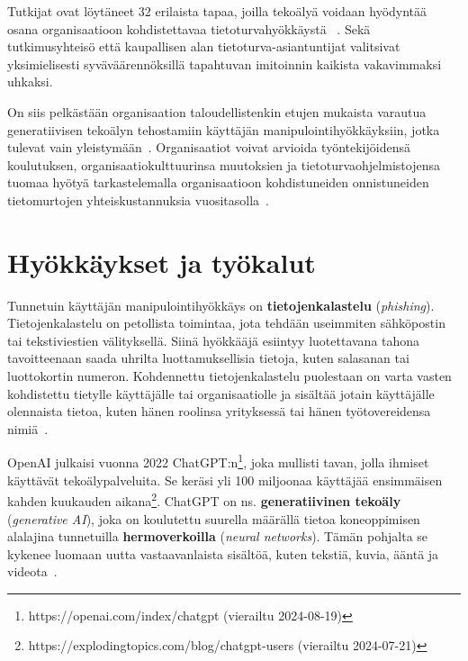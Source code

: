 \begin{otherlanguage}{finnish}
Tutkijat ovat löytäneet 32 erilaista tapaa, joilla tekoälyä voidaan hyödyntää osana organisaatioon kohdistettavaa tietoturvahyökkäystä ~\citep{mirsky_Threat_Offensive_AI_Organizations_2023}. Sekä tutkimusyhteisö että kaupallisen alan tietoturva-asiantuntijat valitsivat yksimielisesti syväväärennöksillä tapahtuvan imitoinnin kaikista vakavimmaksi uhkaksi.


On siis pelkästään organisaation taloudellistenkin etujen mukaista varautua generatiivisen tekoälyn tehostamiin käyttäjän manipulointihyökkäyksiin, jotka tulevat vain yleistymään~\citep{blauth_AI_Crime_Overview_Malicious_Use_Abuse_2022}. Organisaatiot voivat arvioida työntekijöidensä koulutuksen, organisaatiokulttuurinsa muutoksien ja tietoturvaohjelmistojensa tuomaa hyötyä tarkastelemalla organisaatioon kohdistuneiden onnistuneiden tietomurtojen yhteiskustannuksia vuositasolla~\citep{ibm_Cost_Data_Breach_Report_2024}.







\section*{Hyökkäykset ja työkalut}

Tunnetuin käyttäjän manipulointihyökkäys on \textbf{tietojenkalastelu} (\textit{phishing}). Tietojenkalastelu on petollista toimintaa, jota tehdään useimmiten sähköpostin tai tekstiviestien välityksellä. Siinä hyökkääjä esiintyy luotettavana tahona tavoitteenaan saada uhrilta luottamuksellisia tietoja, kuten salasanan tai luottokortin numeron. Kohdennettu tietojenkalastelu puolestaan on varta vasten kohdistettu tietylle käyttäjälle tai organisaatiolle ja sisältää jotain käyttäjälle olennaista tietoa, kuten hänen roolinsa yrityksessä tai hänen työtovereidensa nimiä~\citep{wang_Defining_Social_Engineering_2020}.

OpenAI julkaisi vuonna 2022 ChatGPT:n\footnote{https://openai.com/index/chatgpt (vierailtu 2024-08-19)}, joka mullisti tavan, jolla ihmiset käyttävät tekoälypalveluita. Se keräsi yli 100 miljoonaa käyttäjää ensimmäisen kahden kuukauden aikana\footnote{https://explodingtopics.com/blog/chatgpt-users (vierailtu 2024-07-21)}. ChatGPT on ns. \textbf{generatiivinen tekoäly} (\textit{generative AI}), joka on koulutettu suurella määrällä tietoa koneoppimisen alalajina tunnetuilla \textbf{hermoverkoilla} (\textit{neural networks}). Tämän pohjalta se kykenee luomaan uutta vastaavanlaista sisältöä, kuten tekstiä, kuvia, ääntä ja videota~\citep{fakhouri_AI_Driven_Solutions_SE_Attacks_2024}.


\end{otherlanguage}
